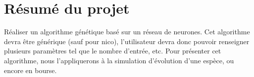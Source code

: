 \chapter{Résumé du projet}
Réaliser un algorithme génétique basé sur un réseau de neurones. Cet algorithme devra être générique (sauf pour nico), l'utilisateur devra donc pouvoir renseigner plusieurs paramètres tel que le nombre d'entrée, etc. Pour présenter cet algorithme, nous l'appliquerons à la simulation d'évolution d'une espèce, ou encore en bourse.


\clearpage
